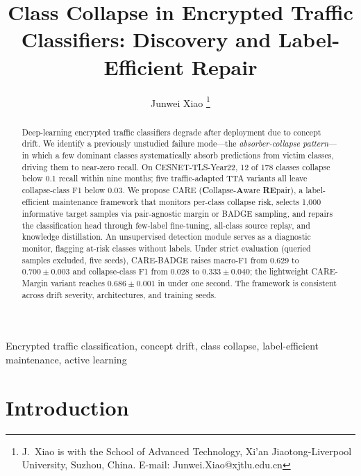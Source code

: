 \documentclass[journal]{IEEEtran}
\newcommand{\ours}{CARE}  %
\begin{document}
\title{Class Collapse in Encrypted Traffic Classifiers: Discovery and Label-Efficient Repair}

\author{
  Junwei Xiao
  \thanks{J.~Xiao is with the School of Advanced Technology, Xi'an Jiaotong-Liverpool University, Suzhou, China. E-mail: Junwei.Xiao@xjtlu.edu.cn}
}

\maketitle

\begin{abstract}
Deep-learning encrypted traffic classifiers degrade after deployment due to concept drift.
We identify a previously unstudied failure mode---the \textit{absorber-collapse pattern}---in which a few dominant classes systematically absorb predictions from victim classes, driving them to near-zero recall.
On CESNET-TLS-Year22, 12 of 178 classes collapse below 0.1 recall within nine months; five traffic-adapted TTA variants all leave collapse-class F1 below 0.03.
We propose \ours{} (\textbf{C}ollapse-\textbf{A}ware \textbf{RE}pair), a label-efficient maintenance framework that monitors per-class collapse risk, selects 1{,}000 informative target samples via pair-agnostic margin or BADGE sampling, and repairs the classification head through few-label fine-tuning, all-class source replay, and knowledge distillation.
An unsupervised detection module serves as a diagnostic monitor, flagging at-risk classes without labels.
Under strict evaluation (queried samples excluded, five seeds), \ours{}-BADGE raises macro-F1 from 0.629 to $0.700{\pm}0.003$ and collapse-class F1 from 0.028 to $0.333{\pm}0.040$; the lightweight \ours{}-Margin variant reaches $0.686{\pm}0.001$ in under one second.
The framework is consistent across drift severity, architectures, and training seeds.
\end{abstract}

\begin{IEEEkeywords}
Encrypted traffic classification, concept drift, class collapse, label-efficient maintenance, active learning
\end{IEEEkeywords}

\section{Introduction}
\label{sec:intro}
\end{document}

